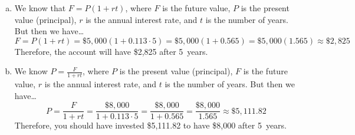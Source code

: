 \documentclass[11pt,letterpaper]{article}
\begin{document}
\sol 
\begin{enumerate}[(a)]
\item We know that $F= P(1 + rt)$, where $F$ is the future value, $P$ is the present value (principal), $r$ is the annual interest rate, and $t$ is the number of years. But then we have\dots
	\[
	F= P(1 + rt)= \$5,\!000 (1 + 0.113 \cdot 5)= \$5,\!000 (1 + 0.565)= \$5,\!000(1.565) \approx \$2,\!825
	\] 
Therefore, the account will have \$2,825 after 5~years. \pspace

\item We know $P= \frac{F}{1 + rt}$, where $P$ is the present value (principal), $F$ is the future value, $r$ is the annual interest rate, and $t$ is the number of years. But then we have\dots
	\[
	P= \dfrac{F}{1 + rt}= \dfrac{\$8,\!000}{1 + 0.113 \cdot 5}= \dfrac{\$8,\!000}{1 + 0.565}= \dfrac{\$8,\!000}{1.565} \approx \$5,\!111.82
	\]
Therefore, you should have invested \$5,111.82 to have \$8,000 after 5~years. 
\end{enumerate}
\end{document}
